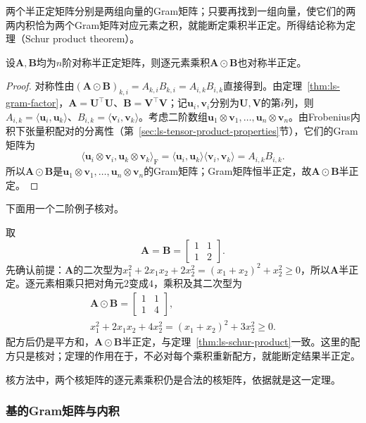 两个半正定矩阵分别是两组向量的Gram矩阵；只要再找到一组向量，使它们的两两内积恰为两个Gram矩阵对应元素之积，就能断定乘积半正定。所得结论称为定理（Schur product theorem）。
\begin{theorem}[Schur乘积定理]
\label{thm:ls-schur-product}
设$\bm A,\bm B$均为$n$阶对称半正定矩阵，则逐元素乘积$\bm A\odot\bm B$也对称半正定。
\end{theorem}
\begin{proof}
对称性由$(\bm A\odot\bm B)_{k,i}=A_{k,i}B_{k,i}=A_{i,k}B_{i,k}$直接得到。由定理~\ref{thm:ls-gram-factor}，$\bm A=\bm U^\top\bm U$、$\bm B=\bm V^\top\bm V$；记$\bm u_i,\bm v_i$分别为$\bm U,\bm V$的第$i$列，则$A_{i,k}=\langle\bm u_i,\bm u_k\rangle$、$B_{i,k}=\langle\bm v_i,\bm v_k\rangle$。考虑二阶数组$\bm u_1\otimes\bm v_1,\ldots,\bm u_n\otimes\bm v_n$。由Frobenius内积下张量积配对的分离性（第~\ref{sec:ls-tensor-product-properties}节），它们的Gram矩阵为
\[
 \langle\bm u_i\otimes\bm v_i,\bm u_k\otimes\bm v_k\rangle_{\mathrm F}
 =\langle\bm u_i,\bm u_k\rangle\langle\bm v_i,\bm v_k\rangle
 =A_{i,k}B_{i,k}.
\]
所以$\bm A\odot\bm B$是$\bm u_1\otimes\bm v_1,\ldots,\bm u_n\otimes\bm v_n$的Gram矩阵；Gram矩阵恒半正定，故$\bm A\odot\bm B$半正定。
\end{proof}
下面用一个二阶例子核对。
\begin{example}[两个半正定矩阵的逐元素乘积]
\label{ex:ls-schur-product}
取
\[
 \bm A=\bm B=\begin{bmatrix}1&1\\1&2\end{bmatrix}.
\]
先确认前提：$\bm A$的二次型为$x_1^2+2x_1x_2+2x_2^2=(x_1+x_2)^2+x_2^2\geq0$，所以$\bm A$半正定。逐元素相乘只把对角元$2$变成$4$，乘积及其二次型为
\[
\begin{gathered}
\bm A\odot\bm B=\begin{bmatrix}1&1\\1&4\end{bmatrix},\\
x_1^2+2x_1x_2+4x_2^2=(x_1+x_2)^2+3x_2^2\geq0 .
\end{gathered}
\]
配方后仍是平方和，$\bm A\odot\bm B$半正定，与定理~\ref{thm:ls-schur-product}一致。这里的配方只是核对；定理的作用在于，不必对每个乘积重新配方，就能断定结果半正定。
\end{example}
核方法中，两个核矩阵的逐元素乘积仍是合法的核矩阵，依据就是这一定理。

\subsubsection{基的Gram矩阵与内积}
\label{sec:ls-gram-coordinates}

